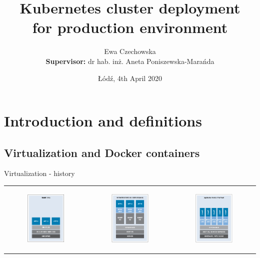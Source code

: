 \documentclass{beamer}
\title{Kubernetes cluster deployment \\ for production environment}
\author{Ewa Czechowska \\
 \textbf{Supervisor: }dr hab. inż. Aneta Poniszewska-Marańda}
\institute{Lodz University of Technology}
\date{Łódź, 4th April 2020}
\begin{document}
\maketitle

\section{Introduction and definitions}
\subsection{Virtualization and Docker containers}
\begin{frame}{Virtualization - history}%
\begin{center}
\begin{tabular}{@{}  l  l l }
	\begin{figure}
		\includegraphics[width=3cm]{figures/virtualization-physical.png}
		\label{fig:virtualization-physical}
	\end{figure} &
	\begin{figure}
		\includegraphics[width=3cm]{figures/virtualization-vms.png}
		\label{fig:virtualization-vms}
	\end{figure} &
	\begin{figure}
		\includegraphics[width=3cm]{figures/virtualization-c.png}

\end{figure}
\end{tabular}
\end{center}
\end{frame}
\end{document}
